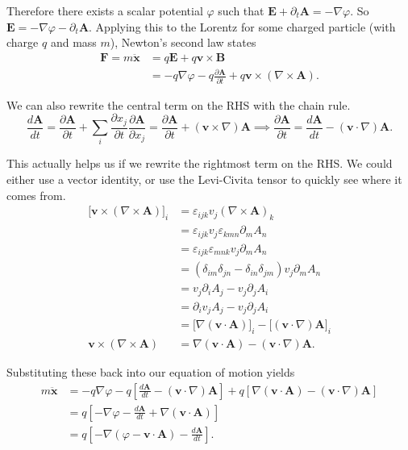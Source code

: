 \documentclass[12pt]{revtex4-2}
\begin{document}
Therefore there exists a scalar potential $\varphi$ such that $\mathbf{E} + \partial_t\mathbf{A} = -\nabla\varphi$.  So $\mathbf{E} = -\nabla\varphi - \partial_t\mathbf{A}$.  Applying this to the Lorentz for some charged particle (with charge $q$ and mass $m$), Newton's second law states
\begin{align}
    \mathbf{F} = m\ddot{\mathbf{x}} &= q\mathbf{E} + q\mathbf{v}\times\mathbf{B} \\
    &= -q\nabla\varphi - q\frac{\partial \mathbf{A}}{\partial t} + q\mathbf{v}\times(\nabla \times \mathbf{A}).
\end{align}

We can also rewrite the central term on the RHS with the chain rule.
\begin{equation}
    \frac{d\mathbf{A}}{dt} = \frac{\partial \mathbf{A}}{\partial t} + \sum_i \frac{\partial x_j}{\partial t}\frac{\partial \mathbf{A}}{\partial x_j} = \frac{\partial \mathbf{A}}{\partial t} + (\mathbf{v} \times \nabla)\mathbf{A} \implies \frac{\partial \mathbf{A}}{\partial t} = \frac{d\mathbf{A}}{dt} - (\mathbf{v} \cdot \nabla)\mathbf{A}.
\end{equation}

This actually helps us if we rewrite the rightmost term on the RHS.  We could either use a vector identity, or use the Levi-Civita tensor to quickly see where it comes from.
\begin{align}
    \big[\mathbf{v}\times(\nabla \times \mathbf{A})\big]_i &= \varepsilon_{ijk}v_j(\nabla \times \mathbf{A})_k \\
    &= \varepsilon_{ijk}v_j\varepsilon_{kmn}\partial_m A_n \\
    &= \varepsilon_{ijk}\varepsilon_{mnk}v_j\partial_m A_n \\
    &= (\delta_{im}\delta_{jn} - \delta_{in}\delta_{jm})v_j\partial_m A_n \\
    &= v_j\partial_i A_j - v_j\partial_j A_i \\
    &= \partial_iv_j A_j - v_j\partial_j A_i \\
    &= \big[ \nabla(\mathbf{v} \cdot \mathbf{A}) \big]_i - \big[ (\mathbf{v}\cdot\nabla) \mathbf{A} \big]_i \\
    \mathbf{v}\times(\nabla \times \mathbf{A}) &= \nabla (\mathbf{v} \cdot \mathbf{A}) - (\mathbf{v}\cdot\nabla) \mathbf{A}.
\end{align}

Substituting these back into our equation of motion yields
\begin{align}
    m\ddot{\mathbf{x}} &= -q\nabla\varphi - q\left[ \frac{d\mathbf{A}}{dt} - (\mathbf{v} \cdot \nabla)\mathbf{A} \right] + q\left[ \nabla(\mathbf{v} \cdot \mathbf{A}) - (\mathbf{v}\cdot\nabla) \mathbf{A} \right] \\
    &= q\left[ -\nabla\varphi - \frac{d\mathbf{A}}{dt} + \nabla(\mathbf{v} \cdot \mathbf{A}) \right] \\
    &= q\left[ -\nabla\left( \varphi - \mathbf{v}\cdot\mathbf{A} \right) - \frac{d\mathbf{A}}{dt} \right]. \label{eqn:em-eom}
\end{align}
\end{document}
